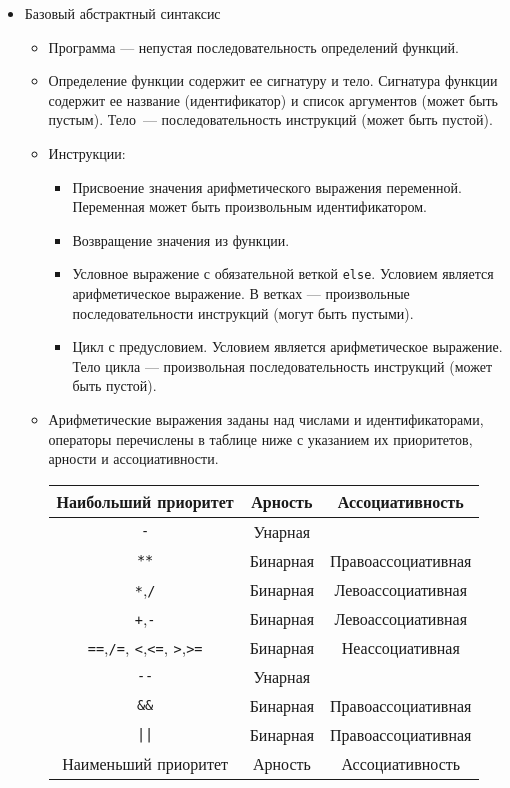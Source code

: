 \begin{itemize}
\begin{itemize}
  \end{itemize}
  \item Базовый абстрактный синтаксис
  \begin{itemize}
    \item Программа --- непустая последовательность определений функций.
    \item Определение функции содержит ее сигнатуру и тело. Сигнатура функции содержит ее название (идентификатор) и список аргументов (может быть пустым). Тело~--- последовательность инструкций (может быть пустой).
    \item Инструкции:
    \begin{itemize}
      \item Присвоение значения арифметического выражения переменной. Переменная может быть произвольным идентификатором.
      \item Возвращение значения из функции.
      \item Условное выражение с обязательной веткой \verb!else!. Условием является арифметическое выражение. В ветках --- произвольные последовательности инструкций (могут быть пустыми).
      \item Цикл с предусловием. Условием является арифметическое выражение. Тело цикла --- произвольная последовательность инструкций (может быть пустой).
    \end{itemize}
    \item Арифметические выражения заданы над числами и идентификаторами, операторы перечислены в таблице ниже с указанием их приоритетов, арности и ассоциативности.

    \begin{center}
      \begin{tabular}{ c | c | c }
        Наибольший приоритет & Арность & Ассоциативность  \\ \hline \hline
        \verb!-! & Унарная & \\
        \verb!**! & Бинарная &Правоассоциативная \\
       \verb!*!,\verb!/! & Бинарная & Левоассоциативная \\
       \verb!+!,\verb!-! & Бинарная & Левоассоциативная \\
       \verb!==!,\verb!/=!, \verb!<!,\verb!<=!, \verb!>!,\verb!>=! & Бинарная & Неассоциативная \\
       \verb!--! & Унарная &  \\

       \verb!&&! & Бинарная & Правоассоциативная \\
       \verb!||! & Бинарная & Правоассоциативная \\
       \hline \hline
       Наименьший приоритет & Арность & Ассоциативность
      \end{tabular}
      \end{center}
  \end{itemize}
\end{itemize}